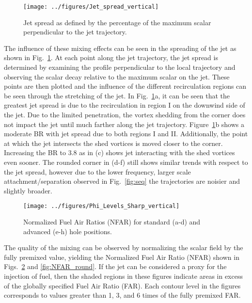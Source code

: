 \documentclass[10pt, twocolumn]{article}
\begin{document}
\begin{figure}[t!]
	\centering
	\texttt{[image: ../figures/Jet\_spread\_vertical]}
	\caption{Jet spread as defined by the percentage of the maximum scalar perpendicular to the jet trajectory.}
	\label{fig:spread}
\end{figure}

The influence of these mixing effects can be seen in the spreading of the jet as shown in Fig.~\ref{fig:spread}. At each point along the jet trajectory, the jet spread is determined by examining the profile perpendicular to the local trajectory and observing the scalar decay relative to the maximum scalar on the jet. These points are then plotted and the influence of the different recirculation regions can be seen through the stretching of the jet. In Fig.~\ref{fig:spread}a, it can be seen that the greatest jet spread is due to the recirculation in region I on the downwind side of the jet. Due to the limited penetration, the vortex shedding from the corner does not impact the jet until much farther along the jet trajectory. Figure~\ref{fig:spread}b shows a moderate BR with jet spread due to both regions I and II. Additionally, the point at which the jet intersects the shed vortices is moved closer to the corner. Increasing the BR to 3.8 as in (c) shows jet interacting with the shed vortices even sooner. The rounded corner in (d-f) still shows similar trends with respect to the jet spread, however due to the lower frequency, larger scale attachment/separation observed in Fig.~\ref{fig:seq} the trajectories are noisier and slightly broader.

\begin{figure}[b!]
	\centering
	\texttt{[image: ../figures/Phi\_Levels\_Sharp\_vertical]}
	\caption{Normalized Fuel Air Ratios (NFAR) for standard (a-d) and advanced (e-h) hole positions.}
	\label{fig:NFAR_sharp}
\end{figure}

The quality of the mixing can be observed by normalizing the scalar field by the fully premixed value, yielding the Normalized Fuel Air Ratio (NFAR) shown in Figs.~\ref{fig:NFAR_sharp} and \ref{fig:NFAR_round}. If the jet can be considered a proxy for the injection of fuel, then the shaded regions in these figures indicate areas in excess of the globally specified Fuel Air Ratio (FAR). Each contour level in the figures corresponds to values greater than 1, 3, and 6 times of the fully premixed FAR.
\end{document}
